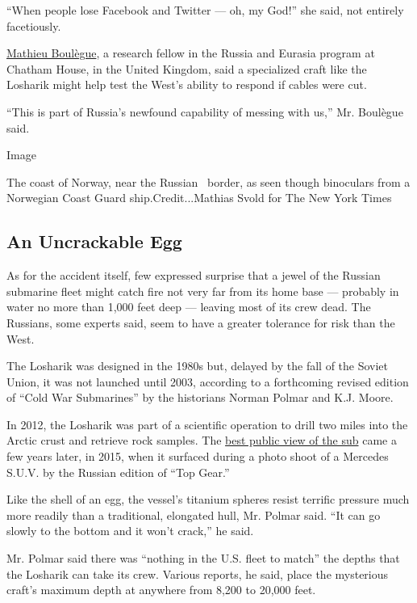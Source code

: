 ``When people lose Facebook and Twitter --- oh, my God!'' she said, not
entirely facetiously.

\href{https://www.chathamhouse.org/expert/mathieu-boulegue}{Mathieu
Boulègue}, a research fellow in the Russia and Eurasia program at
Chatham House, in the United Kingdom, said a specialized craft like the
Losharik might help test the West's ability to respond if cables were
cut.

``This is part of Russia's newfound capability of messing with us,'' Mr.
Boulègue said.

Image

The coast of Norway, near the Russian~ border, as seen though binoculars
from a Norwegian Coast Guard ship.Credit...Mathias Svold for The New
York Times

\hypertarget{an-uncrackable-egg}{%
\subsection{An Uncrackable Egg}\label{an-uncrackable-egg}}

As for the accident itself, few expressed surprise that a jewel of the
Russian submarine fleet might catch fire not very far from its home base
--- probably in water no more than 1,000 feet deep --- leaving most of
its crew dead. The Russians, some experts said, seem to have a greater
tolerance for risk than the West.

The Losharik was designed in the 1980s but, delayed by the fall of the
Soviet Union, it was not launched until 2003, according to a forthcoming
revised edition of ``Cold War Submarines'' by the historians Norman
Polmar and K.J. Moore.

In 2012, the Losharik was part of a scientific operation to drill two
miles into the Arctic crust and retrieve rock samples. The
\href{https://barentsobserver.com/en/security/2015/01/car-magazine-captured-photo-secret-sub-15-01}{best
public view of the sub} came a few years later, in 2015, when it
surfaced during a photo shoot of a Mercedes S.U.V. by the Russian
edition of ``Top Gear.''

Like the shell of an egg, the vessel's titanium spheres resist terrific
pressure much more readily than a traditional, elongated hull, Mr.
Polmar said. ``It can go slowly to the bottom and it won't crack,'' he
said.

Mr. Polmar said there was ``nothing in the U.S. fleet to match'' the
depths that the Losharik can take its crew. Various reports, he said,
place the mysterious craft's maximum depth at anywhere from 8,200 to
20,000 feet.

